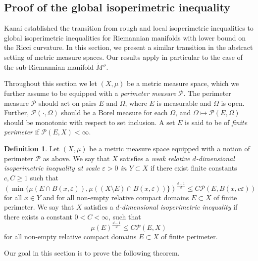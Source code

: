 \documentclass[10pt,letterpaper]{amsart}
\theoremstyle{definition}
\newtheorem{definition}[thm]{Definition}
\numberwithin{thm}{subsection}
\numberwithin{equation}{section}
\begin{document}
\subsection{Proof of the global isoperimetric inequality}
\label{sec:globalisoperimetric}

Kanai \cite[Lemma 4.5]{MR792983} established the transition from rough and local isoperimetric inequalities to global isoperimetric inequalities for {Riemannian} manifolds with lower bound on the Ricci curvature. In this section, we present a similar transition in the abstract setting of metric measure spaces. Our results apply in particular to the case of the sub-Riemannian manifold $\widetilde{M}''$.

Throughout this section we let $(X,\mu)$ be a metric measure space, which we further assume to be equipped with a {\it perimeter measure} $\mathcal P$. The perimeter measure ${\mathcal P}$ should act on pairs $E$ and $\Omega$, where $E$ is measurable and $\Omega$ is open. Further, ${\mathcal P}(\cdot,\Omega)$ should be a Borel measure for each $\Omega$, and $\Omega \mapsto {\mathcal P}(E,\Omega)$ should be monotonic with respect to set inclusion. A set $E$ is said to be of {\it finite perimeter} if ${\mathcal P}(E,X) < \infty$.

\begin{definition}
Let $(X,\mu)$ be a metric measure space equipped with a notion of perimeter $\mathcal{P}$ as above. We say that $X$ satisfies a \emph{weak relative $d$-dimensional isoperimetric inequality at scale $\varepsilon>0$ in $Y\subset X$} if there exist finite constants $c,C\geq 1$ such that
\begin{displaymath}
\left(\min\{\mu(E\cap B(x,\varepsilon)),\mu((X\setminus E)\cap B(x,\varepsilon))\}\right)^{\frac{d-1}{d}} \le C \mathcal{P}(E,B(x,c\varepsilon))
\end{displaymath}
for all $x \in Y$ and for all non-empty relative compact domains $E\subset X$ of finite perimeter. We say that $X$ satisfies a \emph{$d$-dimensional isoperimetric inequality} if there exists a constant $0<C<\infty$, such that
\begin{displaymath}
\mu(E)^{\frac{d-1}{d}} \leq C \mathcal{P}(E,X)
\end{displaymath}
for all non-empty relative compact domains $E\subset X$ of finite perimeter.
\end{definition}

Our goal in this section is to prove the following theorem.
\end{document}
